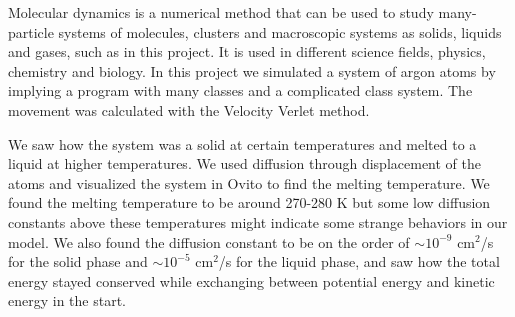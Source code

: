 Molecular dynamics is a numerical method that can be used to study many-particle systems of molecules, clusters and macroscopic systems as solids, liquids and gases, such as in this project. It is used in different science fields, physics, chemistry and biology. In this project we simulated a system of argon atoms by implying a program with many classes and a complicated class system. The movement was calculated with the Velocity Verlet method. 

We saw how the system was a solid at certain temperatures and melted to a liquid at higher temperatures. We used diffusion through displacement of the atoms and visualized the system in Ovito to find the melting temperature. We found the melting temperature to be around 270-280 K but some low diffusion constants above these temperatures might indicate some strange behaviors in our model. We also found the diffusion constant to be on the order of $\sim 10^{-9}$ cm$^2$/s for the solid phase and $\sim 10^{-5}$ cm$^2$/s for the liquid phase, and saw how the total energy stayed conserved while exchanging between potential energy and kinetic energy in the start. 